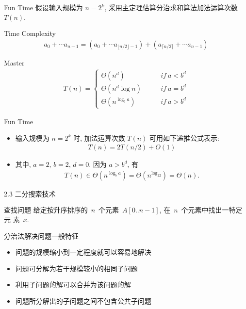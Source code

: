 \documentclass[fontset=fandol,UTF8,fleqn]{beamer}
\begin{document}
\begin{frame}{Fun Time}
  假设输入规模为 $n=2^k$, 采用主定理估算分治求和算法加法运算次数 $T(n)$.
  \begin{exampleblock}{Time Complexity}
      \begin{eqnarray*}
 a_0+\cdots a_{n-1} = (a_0+\cdots a_{\lfloor n/2 \rfloor -1})+(a_{\lceil n/2 \rceil}+\cdots  a_{n-1})
      \end{eqnarray*}
    \end{exampleblock}
    \begin{exampleblock}{Master}
          \begin{eqnarray*}
    T(n) = \left\{
        \begin{array}{ll}
          \Theta(n^d) &\qquad  if\ a < b^d  \\
\Theta(n^d\log n) &\qquad  if \ a = b^d  \\
\Theta(n^{\log_ba}) &\qquad  if\ a > b^d
        \end{array}
\right. 
          \end{eqnarray*}
        \end{exampleblock}
      \end{frame}

\begin{frame}{Fun Time}
\begin{itemize}[<+-|alert@+>]
\item 输入规模为 $n=2^k$ 时, 加法运算次数 $T(n)$ 可用如下递推公式表示:
  \begin{eqnarray*}
    T(n)=2T(n/2)+O(1)     
  \end{eqnarray*}

\item 其中, $a=2$, $b=2$, $d=0$. 因为 $a>b^d$, 有 
  \begin{eqnarray*}
    T(n)\in \Theta(n^{\log_ba})=\Theta(n^{\log_22})=\Theta(n). 
  \end{eqnarray*}
\end{itemize}
\end{frame}

\begin{frame}{2.3 二分搜索技术}
  \begin{exampleblock}{查找问题}
给定按升序排序的~$n$~个元素~$A[0..n-1]$, 在~$n$~个元素中找出一特定元
素~$x$.
\end{exampleblock}
\end{frame}

\begin{frame}{分治法解决问题一般特征} 
\begin{itemize}[<+-|alert@+>]
\item[(1)]问题的规模缩小到一定程度就可以容易地解决
\item[(2)] 问题可分解为若干规模较小的相同子问题
\item[(3)] 利用子问题的解可以合并为该问题的解
\item[(4)] {问题所分解出的子问题之间不包含公共子问题} 
\end{itemize}
\end{frame}
\end{document}
